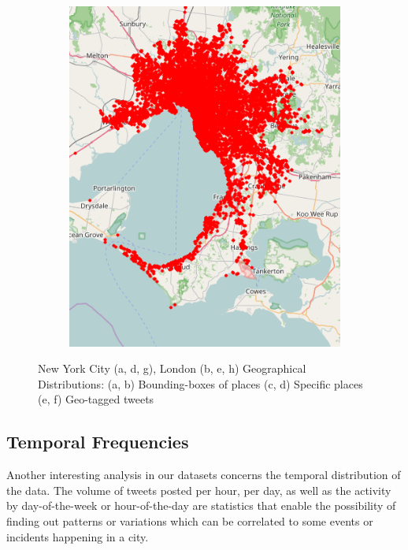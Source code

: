 \begin{figure}[htbp]
	\quad
	\begin{subfigure}[htbp]{0.3\textwidth}
		\centering
		\includegraphics[width=1\linewidth]{figures/melbourne_points.png}
		\caption{}
		\label{subfig:melbourne_points}
	\end{subfigure}
	
	\caption[Exploratory analysis in English-speaking cities]{New York City (a, d, g), London (b, e, h) Geographical Distributions: (a, b) Bounding-boxes of places (c, d) Specific places (e, f) Geo-tagged tweets}
	\label{fig:nyc_london_melbourne_geographical_distribution}
\end{figure}

\subsection{Temporal Frequencies}

Another interesting analysis in our datasets concerns the temporal distribution of the data. The volume of tweets posted per hour, per day, as well as the activity by day-of-the-week or hour-of-the-day are statistics that enable the possibility of finding out patterns or variations which can be correlated to some events or incidents happening in a city.

